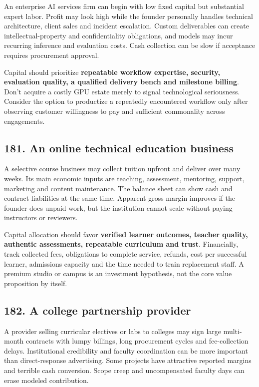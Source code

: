 An enterprise AI services firm can begin with low fixed capital but substantial expert labor. Profit may look high while the founder personally handles technical architecture, client sales and incident escalation. Custom deliverables can create intellectual-property and confidentiality obligations, and models may incur recurring inference and evaluation costs. Cash collection can be slow if acceptance requires procurement approval.

Capital should prioritize \textbf{repeatable workflow expertise, security, evaluation quality, a qualified delivery bench and milestone billing}. Don't acquire a costly GPU estate merely to signal technological seriousness. Consider the option to productize a repeatedly encountered workflow only after observing customer willingness to pay and sufficient commonality across engagements.

\subsection{181. An online technical education business}


A selective course business may collect tuition upfront and deliver over many weeks. Its main economic inputs are teaching, assessment, mentoring, support, marketing and content maintenance. The balance sheet can show cash and contract liabilities at the same time. Apparent gross margin improves if the founder does unpaid work, but the institution cannot scale without paying instructors or reviewers.

Capital allocation should favor \textbf{verified learner outcomes, teacher quality, authentic assessments, repeatable curriculum and trust}. Financially, track collected fees, obligations to complete service, refunds, cost per successful learner, admissions capacity and the time needed to train replacement staff. A premium studio or campus is an investment hypothesis, not the core value proposition by itself.

\subsection{182. A college partnership provider}


A provider selling curricular electives or labs to colleges may sign large multi-month contracts with lumpy billings, long procurement cycles and fee-collection delays. Institutional credibility and faculty coordination can be more important than direct-response advertising. Some projects have attractive reported margins and terrible cash conversion. Scope creep and uncompensated faculty days can erase modeled contribution.

